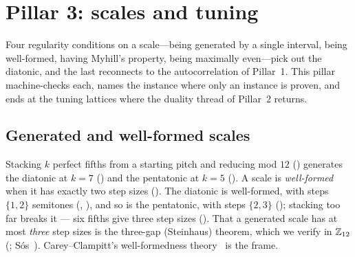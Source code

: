 
\section{Pillar 3: scales and tuning}\label{sec:pillar3}


Four regularity conditions on a scale---being generated by a single interval, being well-formed,
having Myhill's property, being maximally even---pick out the diatonic, and the last reconnects to
the autocorrelation of Pillar~1. This pillar machine-checks each, names the instance where only an
instance is proven, and ends at the tuning lattices where the duality thread of Pillar~2 returns.

\subsection{Generated and well-formed scales}\label{sec:p3-genwf}

Stacking $k$ perfect fifths from a starting pitch and reducing mod $12$ () generates
the diatonic at $k=7$ () and the pentatonic at $k=5$
(). A scale is \emph{well-formed} when it has exactly two
step sizes (). The diatonic is well-formed, with steps $\{1,2\}$ semitones
(, ), and so is the pentatonic, with steps
$\{2,3\}$ (); stacking too far breaks it --- six fifths give three
step sizes (). That a generated scale has at most \emph{three} step sizes is
the three-gap (Steinhaus) theorem, which we verify in $\mathbb{Z}_{12}$ (;
Sós~\cite{Steinhaus}). Carey--Clampitt's well-formedness theory~\cite{CareyClampitt} is the frame.

